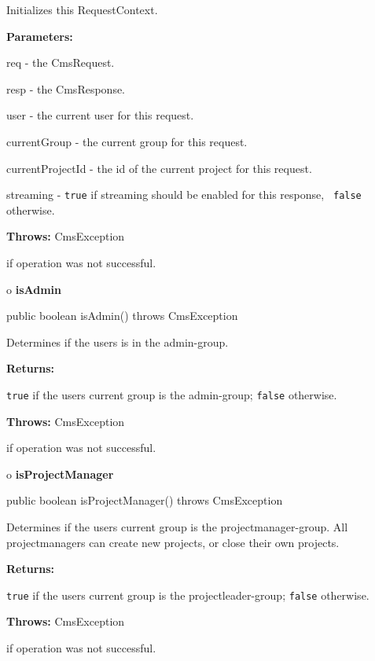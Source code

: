 \begin{description}
\htmlDD Initializes this RequestContext. 

\begin{description}
\item {\bf Parameters:}  

req - the CmsRequest.  

resp - the CmsResponse.  

user - the current user for this request.  

currentGroup - the current group for this request.  

currentProjectId - the id of the current project for this request.  

streaming - {\tt true} if streaming should be enabled for this response, {\tt
false} otherwise.  
\item {\bf Throws:} CmsException  

if operation was not successful.  
\end{description}

\end{description}

o {\bf isAdmin} 

\begin{PRE}
 public boolean isAdmin() throws CmsException
\end{PRE}

\begin{description}
\htmlDD Determines if the users is in the admin-group. 

\begin{description}
\item {\bf Returns:}  

{\tt true} if the users current group is the admin-group; {\tt false}
otherwise.  
\item {\bf Throws:} CmsException  

if operation was not successful.  
\end{description}

\end{description}

o {\bf isProjectManager} 

\begin{PRE}
 public boolean isProjectManager() throws CmsException
\end{PRE}

\begin{description}
\htmlDD Determines if the users current group is the projectmanager-group.
\htmlBR
All projectmanagers can create new projects, or close their own projects. 

\begin{description}
\item {\bf Returns:}  

{\tt true} if the users current group is the projectleader-group; {\tt false}
otherwise.  
\item {\bf Throws:} CmsException  

if operation was not successful.  
\end{description}

\end{description}

